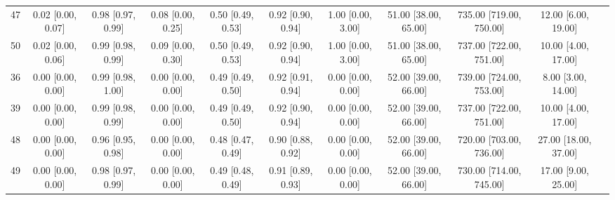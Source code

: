 \documentclass[8pt]{article}
\begin{document}
\begin{center}
\begin{footnotesize}
\begin{longtable}{|ccccccccccc|}
 47 &  0.02 [0.00, 0.07] &  0.98 [0.97, 0.99] &  0.08 [0.00, 0.25] &  0.50 [0.49, 0.53] &  0.92 [0.90, 0.94] &     1.00 [0.00, 3.00] &  51.00 [38.00, 65.00] &  735.00 [719.00, 750.00] &      12.00 [6.00, 19.00] \\
 50 &  0.02 [0.00, 0.06] &  0.99 [0.98, 0.99] &  0.09 [0.00, 0.30] &  0.50 [0.49, 0.53] &  0.92 [0.90, 0.94] &     1.00 [0.00, 3.00] &  51.00 [38.00, 65.00] &  737.00 [722.00, 751.00] &      10.00 [4.00, 17.00] \\
 36 &  0.00 [0.00, 0.00] &  0.99 [0.98, 1.00] &  0.00 [0.00, 0.00] &  0.49 [0.49, 0.50] &  0.92 [0.91, 0.94] &     0.00 [0.00, 0.00] &  52.00 [39.00, 66.00] &  739.00 [724.00, 753.00] &       8.00 [3.00, 14.00] \\
 39 &  0.00 [0.00, 0.00] &  0.99 [0.98, 0.99] &  0.00 [0.00, 0.00] &  0.49 [0.49, 0.50] &  0.92 [0.90, 0.94] &     0.00 [0.00, 0.00] &  52.00 [39.00, 66.00] &  737.00 [722.00, 751.00] &      10.00 [4.00, 17.00] \\
 48 &  0.00 [0.00, 0.00] &  0.96 [0.95, 0.98] &  0.00 [0.00, 0.00] &  0.48 [0.47, 0.49] &  0.90 [0.88, 0.92] &     0.00 [0.00, 0.00] &  52.00 [39.00, 66.00] &  720.00 [703.00, 736.00] &     27.00 [18.00, 37.00] \\
 49 &  0.00 [0.00, 0.00] &  0.98 [0.97, 0.99] &  0.00 [0.00, 0.00] &  0.49 [0.48, 0.49] &  0.91 [0.89, 0.93] &     0.00 [0.00, 0.00] &  52.00 [39.00, 66.00] &  730.00 [714.00, 745.00] &      17.00 [9.00, 25.00] \\
\end{longtable}
\end{footnotesize}
\end{center}
\end{document}
